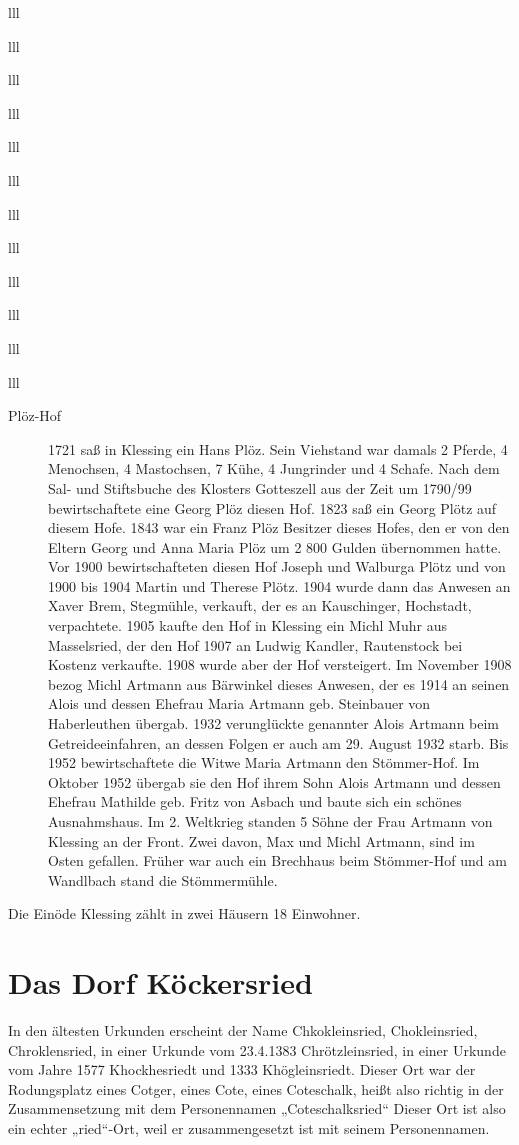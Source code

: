 \documentclass[12pt,a4pager]{book}
\begin{document}
\begin{tabuluar}{lll}
\begin{tabuluar}{lll}
\begin{tabuluar}{lll}
\begin{tabuluar}{lll}
\begin{tabuluar}{lll}
\begin{tabuluar}{lll}
\begin{tabuluar}{lll}
\begin{tabuluar}{lll}
\begin{tabuluar}{lll}
\begin{tabuluar}{lll}
\begin{tabuluar}{lll}
\begin{tabuluar}{lll}
\begin{description}
\item[Plöz-Hof] 1721 saß in Klessing ein Hans Plöz. Sein Viehstand war damals 2
Pferde, 4 Menochsen, 4 Mastochsen, 7 Kühe, 4 Jungrinder und 4 Schafe. Nach dem
Sal- und Stiftsbuche des Klosters Gotteszell aus der Zeit um 1790/99
bewirtschaftete eine Georg Plöz diesen Hof. 1823 saß ein Georg Plötz auf diesem
Hofe. 1843 war ein Franz Plöz Besitzer dieses Hofes, den er von den Eltern Georg
und Anna Maria Plöz um 2 800 Gulden übernommen hatte. Vor 1900 bewirtschafteten
diesen Hof Joseph und Walburga Plötz und von 1900 bis 1904 Martin und Therese
Plötz. 1904 wurde dann das Anwesen an Xaver Brem, Stegmühle, verkauft, der es an
Kauschinger, Hochstadt, verpachtete. 1905 kaufte den Hof in Klessing ein Michl
Muhr aus Masselsried, der den Hof 1907 an Ludwig Kandler, Rautenstock bei
Kostenz verkaufte. 1908 wurde aber der Hof versteigert. Im November 1908 bezog
Michl Artmann aus Bärwinkel dieses Anwesen, der es 1914 an seinen Alois und
dessen Ehefrau Maria Artmann geb. Steinbauer von Haberleuthen übergab. 1932
verunglückte genannter Alois Artmann beim Getreideeinfahren, an dessen Folgen er
auch am 29. August 1932 starb. Bis 1952 bewirtschaftete die Witwe Maria Artmann
den Stömmer-Hof. Im Oktober 1952 übergab sie den Hof ihrem Sohn Alois Artmann
und dessen Ehefrau Mathilde geb. Fritz von Asbach und baute sich ein schönes
Ausnahmshaus. Im 2. Weltkrieg standen 5 Söhne der Frau Artmann von Klessing an
der Front. Zwei davon, Max und Michl Artmann, sind im Osten gefallen. Früher war
auch ein Brechhaus beim Stömmer-Hof und am Wandlbach stand die Stömmermühle.
\end{description}

Die Einöde Klessing zählt in zwei Häusern 18 Einwohner.

\section{Das Dorf Köckersried}

In den ältesten Urkunden erscheint der Name Chkokleinsried, Chokleinsried,
Chroklensried, in einer Urkunde vom 23.4.1383 Chrötzleinsried, in einer Urkunde
vom Jahre 1577 Khockhesriedt und 1333 Khögleinsriedt. Dieser Ort war der
Rodungsplatz eines Cotger, eines Cote, eines Coteschalk, heißt also richtig in
der Zusammensetzung mit dem Personennamen „Coteschalksried“ Dieser Ort ist also
ein echter „ried“-Ort, weil er zusammengesetzt ist mit seinem Personennamen.


\end{tabuluar}
\end{tabuluar}
\end{tabuluar}
\end{tabuluar}
\end{tabuluar}
\end{tabuluar}
\end{tabuluar}
\end{tabuluar}
\end{tabuluar}
\end{tabuluar}
\end{tabuluar}
\end{tabuluar}
\end{document}
